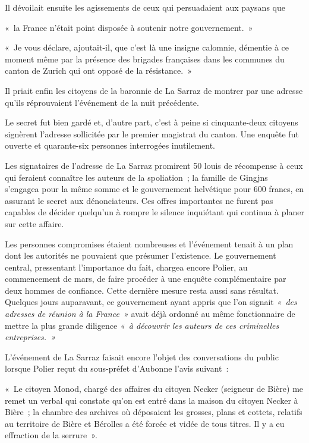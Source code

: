 \documentclass[french,twoside]{book} %
\newenvironment{quoteblock}%
  {\begin{quoting}}
  {\end{quoting}}
\newenvironment{quotebar}{%
    \def\FrameCommand{{\color{rubric!10!}\vrule width 0.5em} \hspace{0.9em}}%
    \def\OuterFrameSep{\itemsep} %
    \MakeFramed {\advance\hsize-\width \FrameRestore}
  }%
  {%
    \endMakeFramed
  }
\renewenvironment{quoteblock}%
  {%
    \savenotes
    \setstretch{0.9}
    \normalfont
    \begin{quotebar}
  }
  {%
    \end{quotebar}
    \spewnotes
  }
\begin{document}
\noindent Il dévoilait ensuite les agissements de ceux qui persuadaient aux paysans que\par

\begin{quoteblock}
 \noindent « la France n’était point disposée à soutenir notre gouvernement. »\par
 « Je vous déclare, ajoutait-il, que c’est là une insigne calomnie, démentie à ce moment même par la présence des brigades françaises dans les communes du canton de Zurich qui ont opposé de la résistance. »
 \end{quoteblock}

\noindent Il priait enfin les citoyens de la baronnie de La Sarraz de montrer par une adresse qu’ils réprouvaient l’événement de la nuit précédente.\par
Le secret fut bien gardé et, d’autre part, c’est à peine si cinquante-deux citoyens signèrent l’adresse sollicitée par le premier magistrat du canton. Une enquête fut ouverte et quarante-six personnes interrogées inutilement.\par
Les signataires de l’adresse de La Sarraz promirent 50 louis de récompense à ceux qui feraient connaître les auteurs de la spoliation ; la famille de Gingjns s’engagea pour la même somme et le gouvernement helvétique pour 600 francs, en assurant le secret aux dénonciateurs. Ces offres importantes ne furent pas capables de décider quelqu’un à rompre le silence inquiétant qui continua à planer sur cette affaire.\par
Les personnes compromises étaient nombreuses et l’événement tenait à un plan dont les autorités ne pouvaient que présumer l’existence. Le gouvernement central, pressentant l’importance du fait, chargea encore Polier, au commencement de mars, de faire procéder à une enquête complémentaire par deux hommes de confiance. Cette dernière mesure resta aussi sans résultat. Quelques jours auparavant, ce gouvernement ayant appris que l’on signait \emph{« des adresses de réunion à la France »} avait déjà ordonné au même fonctionnaire de mettre la plus grande diligence \emph{« à découvrir les auteurs de ces criminelles entreprises. »}\par
L’événement de La Sarraz faisait encore l’objet des conversations du public lorsque Polier reçut du sous-préfet d’Aubonne l’avis suivant :\par

\begin{quoteblock}
 \noindent « Le citoyen Monod, chargé des affaires du citoyen Necker (seigneur de Bière) me remet un verbal qui constate qu’on est entré dans la maison du citoyen Necker à Bière ; la chambre des archives où déposaient les grosses, plans et cottets, relatifs au territoire de Bière et Bérolles a été forcée et vidée de tous titres. Il y a eu effraction de la serrure ».
 \end{quoteblock}
\end{document}

